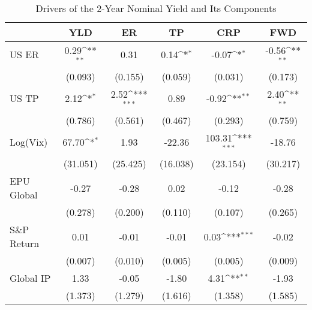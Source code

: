 \begin{table}[htbp]\centering
\def\sym#1{\ifmmode^{#1}\else\(^{#1}\)\fi}
\caption{Drivers of the 2-Year Nominal Yield and Its Components}
\label{tab:ycdcmp2y}
\begin{tabular*}{0.8\hsize}{@{\hskip\tabcolsep\extracolsep\fill}l*{5}{c}}
\toprule
                    &\multicolumn{1}{c}{YLD}&\multicolumn{1}{c}{ER}&\multicolumn{1}{c}{TP}&\multicolumn{1}{c}{CRP}&\multicolumn{1}{c}{FWD}\\
\midrule
US ER               &        0.29\sym{**} &        0.31         &        0.14\sym{*}  &       -0.07\sym{*}  &       -0.56\sym{**} \\
                    &     (0.093)         &     (0.155)         &     (0.059)         &     (0.031)         &     (0.173)         \\
\addlinespace
US TP               &        2.12\sym{*}  &        2.52\sym{***}&        0.89         &       -0.92\sym{**} &        2.40\sym{**} \\
                    &     (0.786)         &     (0.561)         &     (0.467)         &     (0.293)         &     (0.759)         \\
\addlinespace
Log(Vix)            &       67.70\sym{*}  &        1.93         &      -22.36         &      103.31\sym{***}&      -18.76         \\
                    &    (31.051)         &    (25.425)         &    (16.038)         &    (23.154)         &    (30.217)         \\
\addlinespace
EPU Global          &       -0.27         &       -0.28         &        0.02         &       -0.12         &       -0.28         \\
                    &     (0.278)         &     (0.200)         &     (0.110)         &     (0.107)         &     (0.265)         \\
\addlinespace
S\&P Return         &        0.01         &       -0.01         &       -0.01         &        0.03\sym{***}&       -0.02         \\
                    &     (0.007)         &     (0.010)         &     (0.005)         &     (0.005)         &     (0.009)         \\
\addlinespace
Global IP           &        1.33         &       -0.05         &       -1.80         &        4.31\sym{**} &       -1.93         \\
                    &     (1.373)         &     (1.279)         &     (1.616)         &     (1.358)         &     (1.585)         \\

\end{tabular*}
\end{table}
